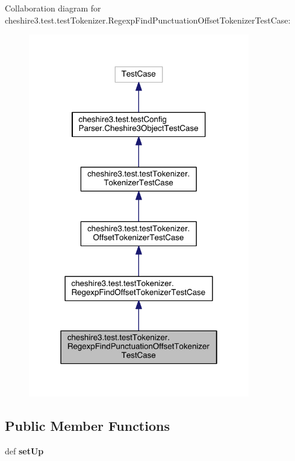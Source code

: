 Collaboration diagram for cheshire3.\-test.\-test\-Tokenizer.\-Regexp\-Find\-Punctuation\-Offset\-Tokenizer\-Test\-Case\-:
\nopagebreak
\begin{figure}[H]
\begin{center}
\leavevmode
\includegraphics[width=274pt]{classcheshire3_1_1test_1_1test_tokenizer_1_1_regexp_find_punctuation_offset_tokenizer_test_case__coll__graph}
\end{center}
\end{figure}
\subsection*{Public Member Functions}
\begin{DoxyCompactItemize}
\item 
\hypertarget{classcheshire3_1_1test_1_1test_tokenizer_1_1_regexp_find_punctuation_offset_tokenizer_test_case_a2f1cef0ec703f4c5012cfcc63258ffba}{def {\bfseries set\-Up}}\label{classcheshire3_1_1test_1_1test_tokenizer_1_1_regexp_find_punctuation_offset_tokenizer_test_case_a2f1cef0ec703f4c5012cfcc63258ffba}

\end{DoxyCompactItemize}
